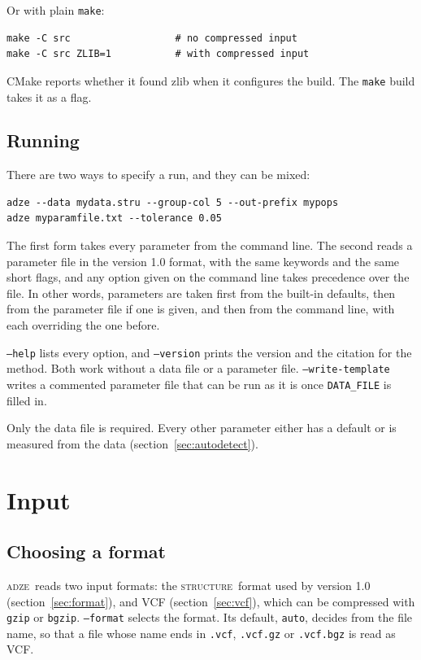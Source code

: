 \documentclass[11pt]{article}
\newcommand{\prog}{\textsc{adze}}
\newcommand{\structureprog}{\textsc{structure}}
\newcommand{\flag}[1]{\texttt{#1}}
\begin{document}
\noindent Or with plain \texttt{make}:
\begin{Verbatim}[xleftmargin=1em]
make -C src                  # no compressed input
make -C src ZLIB=1           # with compressed input
\end{Verbatim}

\noindent CMake reports whether it found zlib when it configures the build.
The \texttt{make} build takes it as a flag.

\subsection{Running}
\label{sec:running}

There are two ways to specify a run, and they can be mixed:
\begin{Verbatim}[xleftmargin=1em]
adze --data mydata.stru --group-col 5 --out-prefix mypops
adze myparamfile.txt --tolerance 0.05
\end{Verbatim}

\noindent The first form takes every parameter from the command line. The
second reads a parameter file in the version 1.0 format, with the same
keywords and the same short flags, and any option given on the command line
takes precedence over the file. In other words, parameters are taken first
from the built-in defaults, then from the parameter file if one is given, and
then from the command line, with each overriding the one before.

\flag{--help} lists every option, and \flag{--version} prints the version and
the citation for the method. Both work without a data file or a parameter
file. \flag{--write-template} writes a commented parameter file that can be run
as it is once \texttt{DATA\_FILE} is filled in.

Only the data file is required. Every other parameter either has a default or
is measured from the data (section~\ref{sec:autodetect}).

\section{Input}

\subsection{Choosing a format}

\prog\ reads two input formats: the \structureprog\ format used by version
1.0 (section~\ref{sec:format}), and VCF (section~\ref{sec:vcf}), which can be
compressed with \texttt{gzip} or \texttt{bgzip}. \flag{--format} selects the
format. Its default, \texttt{auto}, decides from the file name, so that a file
whose name ends in \texttt{.vcf}, \texttt{.vcf.gz} or \texttt{.vcf.bgz} is read
as VCF.
\end{document}
